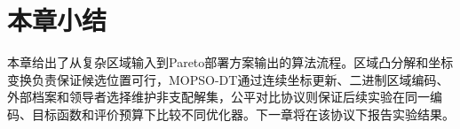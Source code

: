
\section{本章小结}

本章给出了从复杂区域输入到Pareto部署方案输出的算法流程。区域凸分解和坐标变换负责保证候选位置可行，MOPSO-DT通过连续坐标更新、二进制区域编码、外部档案和领导者选择维护非支配解集，公平对比协议则保证后续实验在同一编码、目标函数和评价预算下比较不同优化器。下一章将在该协议下报告实验结果。
